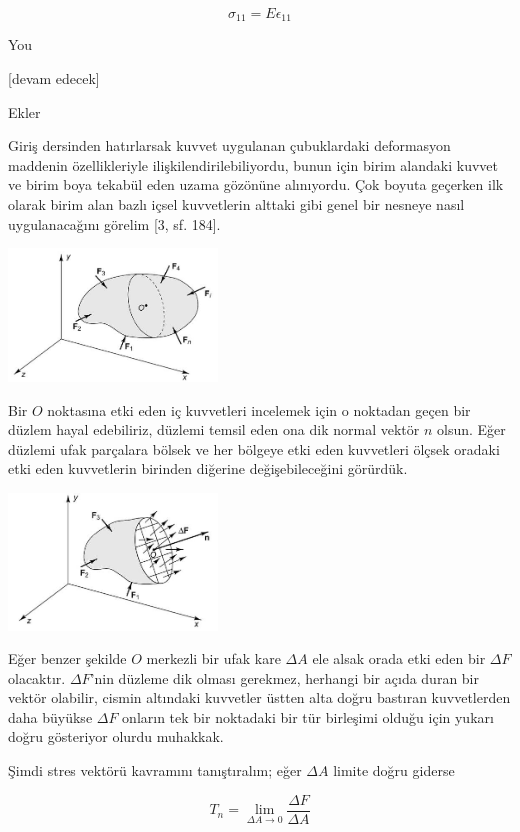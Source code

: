 \documentclass[12pt,fleqn]{article}\usepackage{../../common}
\begin{document}
$$
\sigma_{11} = E \epsilon_{11}
$$

You



[devam edecek]

Ekler

Giriş dersinden hatırlarsak kuvvet uygulanan çubuklardaki deformasyon maddenin
özellikleriyle ilişkilendirilebiliyordu, bunun için birim alandaki kuvvet ve
birim boya tekabül eden uzama gözönüne alınıyordu. Çok boyuta geçerken ilk
olarak birim alan bazlı içsel kuvvetlerin alttaki gibi genel bir nesneye
nasıl uygulanacağını görelim [3, sf. 184].

\includegraphics[width=15em]{phy_020_strs_02_app_01.jpg}

Bir $O$ noktasına etki eden iç kuvvetleri incelemek için o noktadan geçen bir
düzlem hayal edebiliriz, düzlemi temsil eden ona dik normal vektör $n$ olsun.
Eğer düzlemi ufak parçalara bölsek ve her bölgeye etki eden kuvvetleri ölçsek
oradaki etki eden kuvvetlerin birinden diğerine değişebileceğini görürdük.

\includegraphics[width=15em]{phy_020_strs_02_app_02.jpg}

Eğer benzer şekilde $O$ merkezli bir ufak kare $\Delta A$ ele alsak orada etki
eden bir $\Delta F$ olacaktır. $\Delta F$'nin düzleme dik olması gerekmez,
herhangi bir açıda duran bir vektör olabilir, cismin altındaki kuvvetler üstten
alta doğru bastıran kuvvetlerden daha büyükse $\Delta F$ onların tek bir
noktadaki bir tür birleşimi olduğu için yukarı doğru gösteriyor olurdu muhakkak.

Şimdi stres vektörü kavramını tanıştıralım; eğer $\Delta A$ limite doğru giderse

$$
T_n = \lim_{\Delta A \to 0} \frac{\Delta F}{\Delta A}
$$
\end{document}
